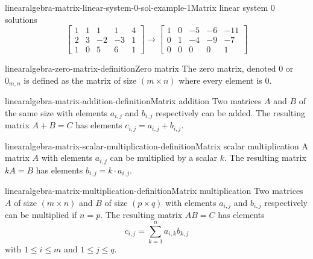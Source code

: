 \documentclass[preview]{standalone}
\begin{document}
\begin{snippetexample}{linearalgebra-matrix-linear-system-0-sol-example-1}{Matrix linear system 0 solutions}{
    \[
        \begin{bmatrix}
            1 & 1 & 1 & 1 & 4 \\
            2 & 3 & -2 & -3 & 1 \\
            1 & 0 & 5 & 6 & 1
        \end{bmatrix}
        \rightarrow
        \begin{bmatrix}
            1 & 0 & -5 & -6 & -11 \\
            0 & 1 & -4 & -9 & -7 \\
            0 & 0 & 0 & 0 & 1
        \end{bmatrix}
    \]
}
\end{snippetexample}

\begin{snippetdefinition}{linearalgebra-zero-matrix-definition}{Zero matrix}{
    The zero matrix, denoted \(0\) or \(0_{m,n}\)
    is defined as the matrix of size \((m \times n)\)
    where every element is \(0\).
}
\end{snippetdefinition}

\begin{snippetdefinition}{linearalgebra-matrix-addition-definition}{Matrix addition}{
    Two matrices \(A\) and \(B\) of the same size
    with elements \(a_{i,j}\) and \(b_{i,j}\) respectively
    can be added. The resulting matrix \(A+B=C\)
    has elements \(c_{i,j} = a_{i,j} + b_{i,j}\).
}
\end{snippetdefinition}

\begin{snippetdefinition}{linearalgebra-matrix-scalar-multiplication-definition}{Matrix scalar multiplication}{
    A matrix \(A\) with elements \(a_{i,j}\)
    can be multiplied by a scalar \(k\).
    The resulting matrix \(kA=B\) has elements
    \(b_{i,j} = k \cdot a_{i,j}\).
}
\end{snippetdefinition}

\begin{snippetdefinition}{linearalgebra-matrix-multiplication-definition}{Matrix multiplication}{
    Two matrices \(A\) of size \((m \times n)\) and
    \(B\) of size \((p \times q)\)
    with elements \(a_{i,j}\) and \(b_{i,j}\) respectively
    can be multiplied if \(n=p\).
    The resulting matrix \(AB=C\) has elements
    \[
        c_{i,j} = \sum_{k=1}^n
        a_{i,k}b_{k,j}
    \]
    with \(1 \leq i \leq m\)
    and \(1 \leq j \leq q\).
}
\end{snippetdefinition}
\end{document}
